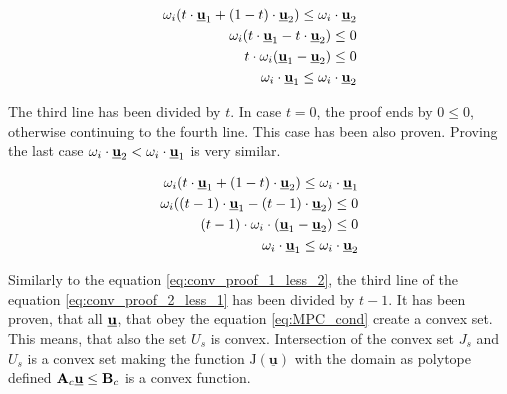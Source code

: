 \documentclass{article}
\newcommand{\uvec}{\textbf{\underline{u}}}
\begin{document}
\begin{equation}
\label{eq:conv_proof_1_less_2}
\begin{split}
\omega_i(t \cdot \uvec_1 + (1-t) \cdot \uvec_2) \leq \omega_i \cdot \uvec_2\\
\omega_i(t \cdot \uvec_1 -t \cdot \uvec_2) \leq 0\\
t \cdot \omega_i(\uvec_1 - \uvec_2) \leq 0\\
\omega_i \cdot \uvec_1 \leq \omega_i \cdot \uvec_2
\end{split}
\end{equation}

The third line has been divided by $t$. In case $t = 0$, the proof ends by $0 \leq 0$, otherwise continuing to the fourth line. This case has been also proven. Proving the last case $\omega_i \cdot \uvec_2 < \omega_i \cdot \uvec_1$ is very similar. 

\begin{equation}
\label{eq:conv_proof_2_less_1}
\begin{split}
\omega_i(t \cdot \uvec_1 + (1-t) \cdot \uvec_2) \leq \omega_i \cdot \uvec_1\\
\omega_i((t - 1) \cdot \uvec_1 - (t - 1) \cdot \uvec_2) \leq 0 \\
(t - 1) \cdot \omega_i \cdot (\uvec_1 - \uvec_2) \leq 0 \\
\omega_i \cdot \uvec_1 \leq \omega_i \cdot \uvec_2
\end{split}
\end{equation}

Similarly to the equation \ref{eq:conv_proof_1_less_2}, the third line of the equation \ref{eq:conv_proof_2_less_1} has been divided by $t-1$. 
It has been proven, that all $\uvec$, that obey the equation \ref{eq:MPC_cond} create a convex set. This means, that also the set $U_s$ is convex. Intersection of the convex set $J_s$ and $U_s$ is a convex set making the function $\mathrm{J}(\underline{\textbf{u}})$ with the domain as polytope defined $\textbf{A}_c \uvec \leq \textbf{B}_c$ is a convex function.
\end{document}
